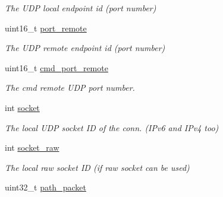 \begin{DoxyCompactItemize}
\begin{DoxyCompactList}\small\item\em The U\-D\-P local endpoint id (port number) \end{DoxyCompactList}\item 
\hypertarget{structconnection__struct_a0678a89d719718e4ea8a8bca49f39d29}{uint16\-\_\-t \hyperlink{structconnection__struct_a0678a89d719718e4ea8a8bca49f39d29}{port\-\_\-remote}}\label{structconnection__struct_a0678a89d719718e4ea8a8bca49f39d29}

\begin{DoxyCompactList}\small\item\em The U\-D\-P remote endpoint id (port number) \end{DoxyCompactList}\item 
\hypertarget{structconnection__struct_ab632d550b334e890f766cf3be14dd1a6}{uint16\-\_\-t \hyperlink{structconnection__struct_ab632d550b334e890f766cf3be14dd1a6}{cmd\-\_\-port\-\_\-remote}}\label{structconnection__struct_ab632d550b334e890f766cf3be14dd1a6}

\begin{DoxyCompactList}\small\item\em The cmd remote U\-D\-P port number. \end{DoxyCompactList}\item 
\hypertarget{structconnection__struct_a3666576f6b88007cc7b8f26c7da596c8}{int \hyperlink{structconnection__struct_a3666576f6b88007cc7b8f26c7da596c8}{socket}}\label{structconnection__struct_a3666576f6b88007cc7b8f26c7da596c8}

\begin{DoxyCompactList}\small\item\em The local U\-D\-P socket I\-D of the conn. (I\-Pv6 and I\-Pv4 too) \end{DoxyCompactList}\item 
\hypertarget{structconnection__struct_a9c9aae34155201bf6d418b00ac2f399f}{int \hyperlink{structconnection__struct_a9c9aae34155201bf6d418b00ac2f399f}{socket\-\_\-raw}}\label{structconnection__struct_a9c9aae34155201bf6d418b00ac2f399f}

\begin{DoxyCompactList}\small\item\em The local raw socket I\-D (if raw socket can be used) \end{DoxyCompactList}\item 
\hypertarget{structconnection__struct_a4dc7ecdd9e0da2e27681fc093db30084}{uint32\-\_\-t \hyperlink{structconnection__struct_a4dc7ecdd9e0da2e27681fc093db30084}{path\-\_\-packet}}\label{structconnection__struct_a4dc7ecdd9e0da2e27681fc093db30084}


\end{DoxyCompactItemize}

